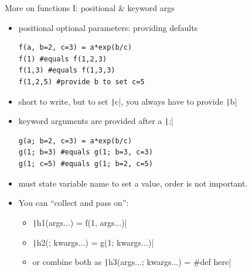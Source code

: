 \documentclass[aspectratio=169, 11pt, handout]{beamer}
\begin{document}
    \begin{frame}[fragile]{More on functions I: positional \& keyword args}
        \begin{itemize}
            \item \alert{positional optional} parameters: providing defaults
        \begin{verbatim}
f(a, b=2, c=3) = a*exp(b/c)
f(1) #equals f(1,2,3)
f(1,3) #equals f(1,3,3)
f(1,2,5) #provide b to set c=5
        \end{verbatim}
        \item short to write, \alert{but} to set \texttt|c|, you always have to provide \texttt|b|
            \pause
            \item \alert{keyword arguments} are provided after a \texttt|;|
        \begin{verbatim}
g(a; b=2, c=3) = a*exp(b/c)
g(1; b=3) #equals g(1; b=3, c=3)
g(1; c=5) #equals g(1; b=2, c=5)
        \end{verbatim}
            \item must state variable name to set a value, order is \alert{not} important.
            \pause
        \item You can “collect and pass on”:
            \begin{itemize}
                \item \texttt|h1(args...) = f(1, args...)|
                \item \texttt|h2(; kwargs...) = g(1; kwargs...)|
                \item or combine both as \texttt|h3(args...; kwargs...) = #def here|
            \end{itemize}
        \end{itemize}
    \end{frame}
\end{document}
